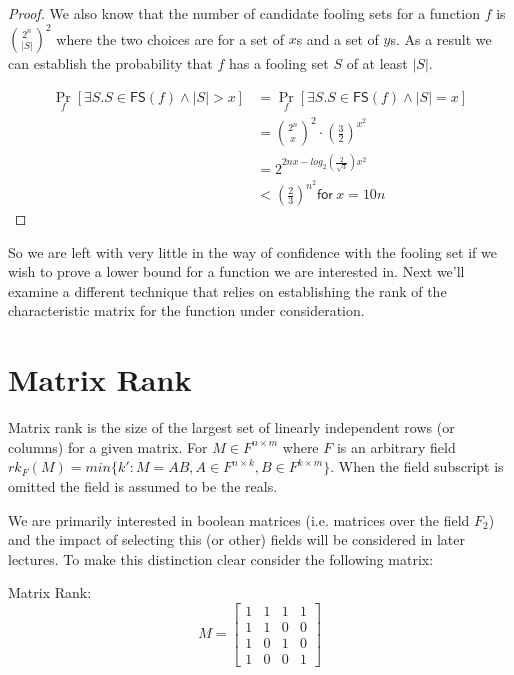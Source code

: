 \documentclass[usletter]{article}
\begin{document}
\begin{proof}
We also know that the number of candidate fooling sets for a function $f$ is ${2^n \choose |S|}^2$ where the two choices are for a set of $x$s and a set of $y$s. As a result we can establish the probability that $f$ has a fooling set $S$ of at least $|S|$.

\begin{align*}
\Pr_f\left[ \exists S. S \in \mathsf{FS}(f) \land |S| > x \right]
  &= \Pr_f\left[ \exists S. S \in \mathsf{FS}(f) \land |S| = x \right] \\
  &= {2^n \choose x}^2 \cdot \left( \frac{3}{2} \right)^{x^2} \\
  &= 2^{2nx - log_2(\frac{2}{\sqrt{3}})x^2} \\
  &< \left( \frac{2}{3} \right)^{n^2} \mathsf{for}\ x = 10n
\end{align*}
\end{proof}

So we are left with very little in the way of confidence with the fooling set if we wish to prove a lower bound for a function we are interested in. Next we'll examine a different technique that relies on establishing the rank of the characteristic matrix for the function under consideration.

\section{Matrix Rank} \label{sec:matrix-rank}

\begin{definition}
  Matrix rank is the size of the largest set of linearly independent rows (or columns) for a given matrix. For $M \in F^{n \times m}$ where $F$ is an arbitrary field $rk_{F}(M) = min \{ k' : M = AB, A \in F^{n \times k}, B \in F^{k \times m} \}$. When the field subscript is omitted the field is assumed to be the reals.
\end{definition}

We are primarily interested in boolean matrices (i.e. matrices over the field $F_2$) and the impact of selecting this (or other) fields will be considered in later lectures. To make this distinction clear consider the following matrix:

\begin{example}
Matrix Rank:
\begin{equation*}
  M =
  \begin{bmatrix}
    1 & 1 & 1 & 1 \\
    1 & 1 & 0 & 0 \\
    1 & 0 & 1 & 0 \\
    1 & 0 & 0 & 1
  \end{bmatrix}
\end{equation*}
\end{example}
\end{document}
